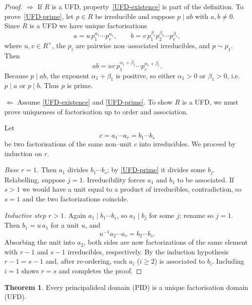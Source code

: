 \documentclass[12pt]{article}
\theoremstyle{definition} %
\newtheorem{theorem}{Theorem}
\theoremstyle{plain} %
\begin{document}
    \begin{proof}
    \textbf{$\Longrightarrow$}\;
    If $R$ is a UFD, property~\ref{UFD-existence} is part of the definition.
    To prove~\ref{UFD-prime}, let $p\in R$ be irreducible and suppose
    $p\mid ab$ with $a,b\neq0$.
    Since $R$ is a UFD we have unique factorisations
    \[
      a = u\,p_1^{\alpha_1}\cdots p_r^{\alpha_r},
      \qquad
      b = v\,p_1^{\beta_1}p_2^{\beta_2}\cdots p_r^{\beta_r},
    \]
    where $u,v\in R^\times$, the $p_i$ are pairwise non--associated
    irreducibles, and $p\sim p_1$.
    Then
    \[
      ab
       = uv\,p_1^{\alpha_1+\beta_1}\cdots p_r^{\alpha_r+\beta_r}.
    \]
    Because $p\mid ab$, the exponent $\alpha_1+\beta_1$ is positive, so
    either $\alpha_1>0$ or $\beta_1>0$, i.e.\ $p\mid a$ or $p\mid b$.
    Thus $p$ is prime.
    
    \smallskip
    \textbf{$\Longleftarrow$}\;
    Assume \ref{UFD-existence} and \ref{UFD-prime}.
    To show $R$ is a UFD, we must prove uniqueness of factorisation
    up to order and association.
    
    Let
    \[
      c = a_1\cdots a_r = b_1\cdots b_s
    \]
    be two factorisations of the same non--unit $c$ into irreducibles.
    We proceed by induction on $r$.
    
    \emph{Base $r=1$.}
    Then $a_1$ divides $b_1\cdots b_s$; by
    \ref{UFD-prime} it divides some $b_j$.
    Relabelling, suppose $j=1$.
    Irreducibility forces $a_1$ and $b_1$ to be associated.
    If $s>1$ we would have a unit equal to a product of irreducibles,
    contradiction, so $s=1$ and the two factorizations coincide.
    
    \emph{Inductive step $r>1$.}
    Again $a_1\mid b_1\cdots b_s$, so $a_1\mid b_j$ for some $j$; rename
    so $j=1$.
    Then $b_1=u\,a_1$ for a unit $u$, and
    \[
      u^{-1}a_2\cdots a_r = b_2\cdots b_s.
    \]
    Absorbing the unit into $a_2$, both sides are now factorizations of the
    same element with $r-1$ and $s-1$ irreducibles, respectively.
    By the induction hypothesis $r-1=s-1$ and, after re-ordering,
    each $a_i$ ($i\ge2$) is associated to $b_i$.
    Including $i=1$ shows $r=s$ and completes the proof.
    \end{proof}
    \begin{theorem}
      Every principal\-ideal domain (PID) is a unique factorisation domain (UFD).
      \end{theorem}
      
\end{document}
